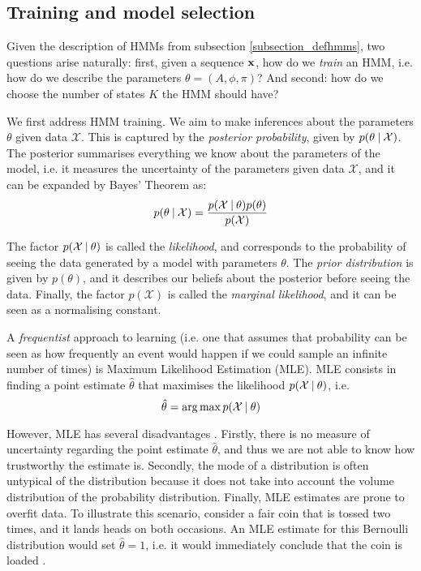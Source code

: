\documentclass[../main.tex]{subfiles}
\begin{document}
\subsection{Training and model selection} \label{subsection_model}
Given the description of HMMs from subsection \ref{subsection_defhmms}, two questions arise naturally: first, given a sequence $\mathbf{x}$, how do we \emph{train} an HMM, i.e. how do we describe the parameters $\theta = (A, \phi, \pi)$? And second: how do we choose the number of states $K$ the HMM should have?
\par We first address HMM training. We aim to make inferences about the parameters $\theta$ given data $\mathcal{X}$. This is captured by the \emph{posterior probability}, given by $p(\theta \:\vert\: \mathcal{X})$. The posterior summarises everything we know about the parameters of the model, i.e. it measures the uncertainty of the parameters given data $\mathcal{X}$, and it can be expanded by Bayes' Theorem as:
\begin{equation}\label{eq:bayes_posterior}
p(\theta \:\vert\: \mathcal{X}) = \frac{p(\mathcal{X} \:\vert\: \theta)p(\theta)}{p(\mathcal{X})}
\end{equation}
\par The factor $p(\mathcal{X} \:\vert\: \theta)$ is called the \emph{likelihood}, and corresponds to the probability of seeing the data generated by a model with parameters $\theta$. The \emph{prior distribution} is given by $p(\theta)$, and it describes our beliefs about the posterior before seeing the data. Finally, the factor $p(\mathcal{X})$ is called the \emph{marginal likelihood}, and it can be seen as a normalising constant. 
\par A \emph{frequentist} approach to learning (i.e. one that assumes that probability can be seen as how frequently an event would happen if we could sample an infinite number of times) is Maximum Likelihood Estimation (MLE). MLE consists in finding a point estimate $\hat{\theta}$ that maximises the likelihood $p(\mathcal{X} \:\vert\: \theta)$, i.e.
\begin{equation}
\hat{\theta} = \operatorname*{arg\,max}{p(\mathcal{X} \:\vert\: \theta)}
\end{equation}
\par However, MLE has several disadvantages \cite{Murphy2012}. Firstly, there is no measure of uncertainty regarding the point estimate $\hat{\theta}$, and thus we are not able to know how trustworthy the estimate is. Secondly, the mode of a distribution is often untypical of the distribution \cite{Murphy2012} because it does not take into account the volume distribution of the probability distribution. Finally, MLE estimates are prone to overfit data. To illustrate this scenario, consider a fair coin that is tossed two times, and it lands heads on both occasions. An MLE estimate for this Bernoulli distribution would set $\hat{\theta} = 1$, i.e. it would immediately conclude that the coin is loaded \cite{Murphy2012}.
\end{document}
